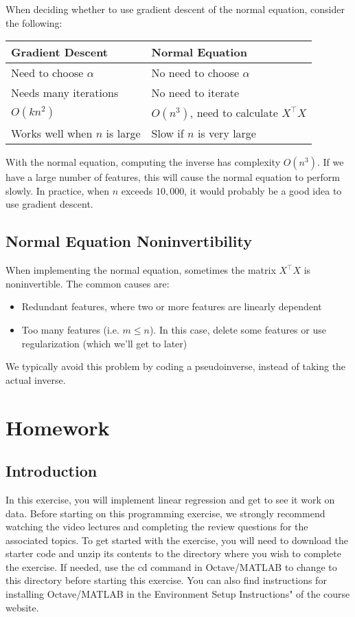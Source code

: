 When deciding whether to use gradient descent of the normal equation, consider the following:

\begin{tabular}{| l | l |} \hline
\textbf{Gradient Descent} & \textbf{Normal Equation} \\
\hline \hline
Need to choose $\alpha$ & No need to choose $\alpha$ \\ \hline
Needs many iterations & No need to iterate \\ \hline
$O\left( kn^2 \right)$ & $O\left(n^3\right)$, need to calculate $X^\intercal X$ \\ \hline
Works well when $n$ is large & Slow if $n$ is very large \\ \hline
\end{tabular}

With the normal equation, computing the inverse has complexity $O\left( n^3 \right)$. If we have a large number of features, this will cause the normal equation to perform slowly. In practice, when $n$ exceeds $10,000$, it would probably be a good idea to use gradient descent. 

\subsection{Normal Equation Noninvertibility}
When implementing the normal equation, sometimes the matrix $X^\intercal X$ is noninvertible. The common causes are:
\begin{itemize}
\item Redundant features, where two or more features are linearly dependent
\item Too many features (i.e. $m \leq n$). In this case, delete some features or use regularization (which we'll get to later)
\end{itemize}

We typically avoid this problem by coding a pseudoinverse, instead of taking the actual inverse. 

\section{Homework}

\subsection*{Introduction}
In this exercise, you will implement linear regression and get to see it work on data. Before starting on this programming exercise, we strongly recommend watching the video lectures and completing the review questions for the associated topics. To get started with the exercise, you will need to download the starter code and unzip its contents to the directory where you wish to complete the exercise. If needed, use the cd command in Octave/MATLAB to change to this directory before starting this exercise. You can also find instructions for installing Octave/MATLAB in the Environment Setup Instructions" of the course website. \\

